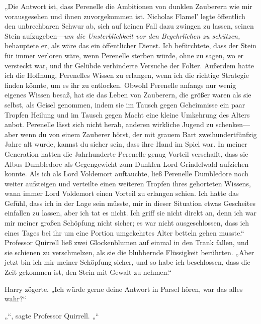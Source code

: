 „Die Antwort ist, dass Perenelle die Ambitionen von dunklen Zauberern wie mir vorausgesehen und ihnen zuvorgekommen ist. Nicholas Flamel' legte öffentlich den unbrechbaren Schwur ab, sich auf keinen Fall dazu zwingen zu lassen, seinen Stein aufzugeben—\emph{um die Unsterblichkeit vor den Begehrlichen zu schützen,} behauptete er, als wäre das ein öffentlicher Dienst. Ich befürchtete, dass der Stein für immer verloren wäre, wenn Perenelle sterben würde, ohne zu sagen, wo er versteckt war, und ihr Gelübde verhinderte Versuche der Folter. Außerdem hatte ich die Hoffnung, Perenelles Wissen zu erlangen, wenn ich die richtige Strategie finden könnte, um es ihr zu entlocken. Obwohl Perenelle anfangs nur wenig eigenes Wissen besaß, hat sie das Leben von Zauberern, die größer waren als sie selbst, als Geisel genommen, indem sie im Tausch gegen Geheimnisse ein paar Tropfen Heilung und im Tausch gegen Macht eine kleine Umkehrung des Alters anbot. Perenelle lässt sich nicht herab, anderen wirkliche Jugend zu schenken—aber wenn du von einem Zauberer hörst, der mit grauem Bart zweihundertfünfzig Jahre alt wurde, kannst du sicher sein, dass ihre Hand im Spiel war. In meiner Generation hatten die Jahrhunderte Perenelle genug Vorteil verschafft, dass sie Albus Dumbledore als Gegengewicht zum Dunklen Lord Grindelwald aufziehen konnte. Als ich als Lord Voldemort auftauchte, ließ Perenelle Dumbledore noch weiter aufsteigen und verteilte einen weiteren Tropfen ihres gehorteten Wissens, wann immer Lord Voldemort einen Vorteil zu erlangen schien. Ich hatte das Gefühl, dass ich in der Lage sein müsste, mir in dieser Situation etwas Gescheites einfallen zu lassen, aber ich tat es nicht. Ich griff sie nicht direkt an, denn ich war mir meiner großen Schöpfung nicht sicher; es war nicht ausgeschlossen, dass ich eines Tages bei ihr um eine Portion umgekehrtes Alter betteln gehen musste.“
Professor Quirrell ließ zwei Glockenblumen auf einmal in den Trank fallen, und sie schienen zu verschmelzen, als sie die blubbernde Flüssigkeit berührten.
„Aber jetzt bin ich mir meiner Schöpfung sicher, und so habe ich beschlossen, dass die Zeit gekommen ist, den Stein mit Gewalt zu nehmen.“

Harry zögerte.
„Ich würde gerne deine Antwort in Parsel hören, war das alles wahr?“

„“, sagte Professor Quirrell.
„“

